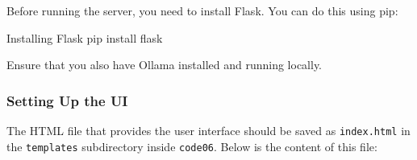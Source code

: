 Before running the server, you need to install Flask. You can do this using pip:

\begin{codeonly}{Installing Flask}
pip install flask
\end{codeonly}

Ensure that you also have Ollama installed and running locally.

\subsubsection{Setting Up the UI}

The HTML file that provides the user interface should be saved as \texttt{index.html} in the \texttt{templates} subdirectory inside \texttt{code06}. Below is the content of this file:

